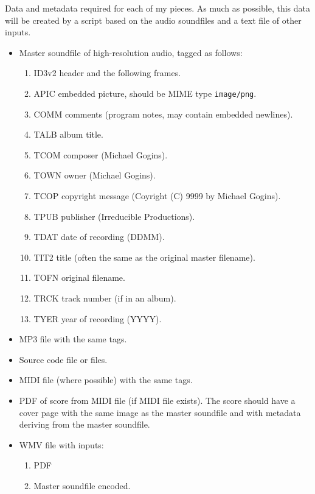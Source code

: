 \documentclass[english,11pt,letterpaper,onecolumn]{scrartcl}
\begin{document}
Data and metadata required for each of my pieces. As much as possible, this data will be created by a script based on the audio soundfiles and a text file of other inputs.

\begin{itemize}
	\item Master soundfile of high-resolution audio, tagged as follows:
	\begin{enumerate}
		\item ID3v2 header and the following frames.
		\item APIC embedded picture, should be MIME type \texttt{image/png}.
		\item COMM comments (program notes, may contain embedded newlines).
		\item TALB album title.
		\item TCOM composer (Michael Gogins).
		\item TOWN owner (Michael Gogins).
		\item TCOP copyright message (Coyright (C) 9999 by Michael Gogins).
		\item TPUB publisher (Irreducible Productions).
		\item TDAT date of recording (DDMM).
		\item TIT2 title (often the same as the original master filename).
		\item TOFN original filename.
		\item TRCK track number (if in an album).
		\item TYER year of recording (YYYY).
	\end{enumerate}
	\item MP3 file with the same tags.
	\item Source code file or files.
	\item MIDI file (where possible) with the same tags.
	\item PDF of score from MIDI file (if MIDI file exists). The score should have a cover page with the same image as the master soundfile and with metadata deriving from the master soundfile.
	\item WMV file with inputs:
	\begin{enumerate}
		\item PDF
		\item Master soundfile encoded.

	\end{enumerate}
\end{itemize}
\end{document}
